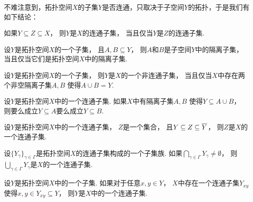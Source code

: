 不难注意到，拓扑空间\(X\)的子集\(Y\)是否连通，只取决于子空间\(Y\)的拓扑，于是我们有如下结论：
\begin{proposition}
如果\(Y \subseteq Z \subseteq X\)，
则\(Y\)是\(X\)的连通子集，
当且仅当\(Y\)是\(Z\)的连通子集.
\end{proposition}

\begin{theorem}
设\(Y\)是拓扑空间\(X\)的一个子集，
且\(A,B \subseteq Y\)，
则\(A\)和\(B\)是子空间\(Y\)中的隔离子集，
当且仅当它们是拓扑空间\(X\)中的隔离子集.
\end{theorem}

\begin{corollary}
设\(Y\)是拓扑空间\(X\)的一个子集，
则\(Y\)是\(X\)的一个非连通子集，
当且仅当\(X\)中存在两个非空隔离子集\(A,B\)
使得\(A \cup B = Y\).
\end{corollary}

\begin{theorem}
设\(Y\)是拓扑空间\(X\)中的一个连通子集.
如果\(X\)中有隔离子集\(A,B\)
使得\(Y \subseteq A \cup B\)，
则要么成立\(Y \subseteq A\)要么成立\(Y \subseteq B\).
\end{theorem}

\begin{theorem}
设\(Y\)是拓扑空间\(X\)中的一个连通子集，
\(Z\)是一个集合，
且\(Y \subseteq Z \subseteq \overline{Y}\)，
则\(Z\)是\(X\)的一个连通子集.
\end{theorem}

\begin{theorem}
设\(\{Y_\gamma\}_{\gamma \in \Gamma}\)是拓扑空间\(X\)的连通子集构成的一个子集族.
如果\(\bigcap_{\gamma \in \Gamma} Y_\gamma \neq \emptyset\)，
则\(\bigcup_{\gamma \in \Gamma} Y_\gamma\)是\(X\)的一个连通子集.
\end{theorem}

\begin{theorem}
设\(Y\)是拓扑空间\(X\)中的一个子集.
如果对于任意\(x,y \in Y\)，
\(X\)中存在一个连通子集\(Y_{xy}\)
使得\(x,y \in Y_{xy} \subseteq Y\)，
则\(Y\)是\(X\)中的一个连通子集.
\end{theorem}


